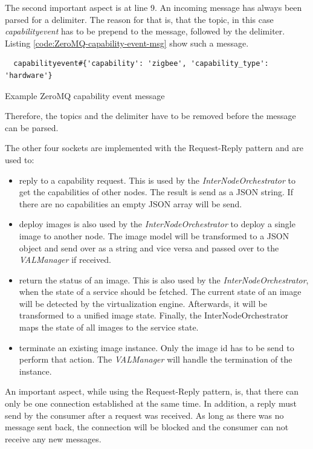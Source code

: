 The second important aspect is at line 9.
An incoming message has always been parsed for a delimiter.
The reason for that is, that the topic, in this case \textit{capabilityevent} has to be prepend to the message, followed by the delimiter.
Listing \ref{code:ZeroMQ-capability-event-msg} show such a message.
\begin{listing}[H]
  \begin{verbatim}
  capabilityevent#{'capability': 'zigbee', 'capability_type': 'hardware'}
  \end{verbatim}
  \caption{Example ZeroMQ capability event message}
  \label{code:ZeroMQ-capability-event-msg}
\end{listing}
Therefore, the topics and the delimiter have to be removed before the message can be parsed.\newline

The other four sockets are implemented with the Request-Reply pattern and are used to:
\begin{itemize}
  \item reply to a capability request.
  This is used by the \textit{InterNodeOrchestrator} to get the capabilities of other nodes.
  The result is send as a \ac{JSON} string.
  If there are no capabilities an empty \ac{JSON} array will be send.
  \item deploy images is also used by the \textit{InterNodeOrchestrator} to deploy a single image to another node.
  The image model will be transformed to a \ac{JSON} object and send over as a string and vice versa and passed over to the \textit{VALManager} if received.
  \item return the status of an image.
  This is also used by the \textit{InterNodeOrchestrator}, when the state of a service should be fetched.
  The current state of an image will be detected by the virtualization engine.
  Afterwards, it will be transformed to a unified image state.
  Finally, the InterNodeOrchestrator maps the state of all images to the service state.
  \item terminate an existing image instance.
  Only the image id has to be send to perform that action.
  The \textit{VALManager} will handle the termination of the instance.
\end{itemize}
\bigskip

An important aspect, while using the Request-Reply pattern, is, that there can only be one connection established at the same time.
In addition, a reply must send by the consumer after a request was received.
As long as there was no message sent back, the connection will be blocked and the consumer can not receive any new messages.\newline

